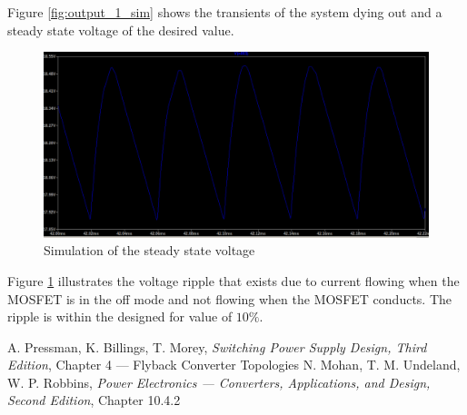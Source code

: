 \documentclass[a4paper, 12pt]{article}
\begin{document}
Figure \ref{fig:output_1_sim} shows the transients of the system dying out and a steady state voltage of the desired value.

\begin{figure}[H]
  \centering
  \includegraphics[width=\textwidth]{images/output_2_sim.png}
  \caption{Simulation of the steady state voltage}
  \label{fig:output_2_sim}
\end{figure}

Figure \ref{fig:output_2_sim} illustrates the voltage ripple that exists due to current flowing when the MOSFET is in the off mode and not flowing when the MOSFET conducts. The ripple is within the designed for value of $10\%$. 
  


\begin{thebibliography}{0}
	 A. Pressman, K. Billings, T. Morey, \textit{Switching Power Supply Design, Third Edition}, Chapter 4 --- Flyback Converter Topologies
	 N. Mohan, T. M. Undeland, W. P. Robbins, \textit{Power Electronics --- Converters, Applications, and Design, Second Edition}, Chapter 10.4.2 
\end{thebibliography}
\end{document}

